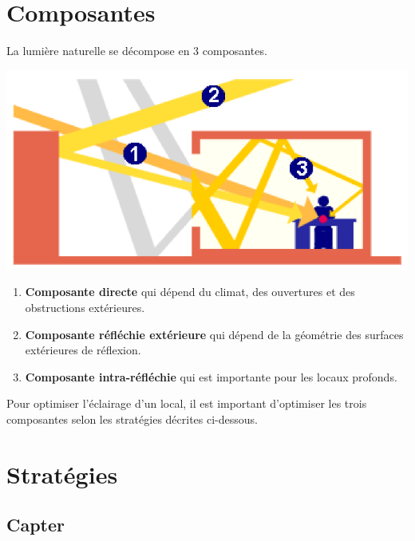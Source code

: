 \documentclass[11pt]{report}
\begin{document}
\section{Composantes}
La lumière naturelle se décompose en 3 composantes.

\begin{minipage}{0.4\linewidth}
\centering
\includegraphics[scale=0.35]{compo}
\end{minipage}
\begin{minipage}{0.6\linewidth}
\begin{enumerate}
\item \textbf{Composante directe} qui dépend du climat, des ouvertures et des obstructions extérieures.
\item  \textbf{Composante réfléchie extérieure} qui dépend de la géométrie des surfaces extérieures de réflexion.
\item \textbf{Composante intra-réfléchie} qui est importante pour les locaux profonds.
\end{enumerate}
\end{minipage}


\vspace{5mm}
Pour optimiser l'éclairage d'un local, il est important d'optimiser les trois composantes selon les stratégies décrites ci-dessous.


\section{Stratégies}

\subsection{Capter}
\\
\end{document}
